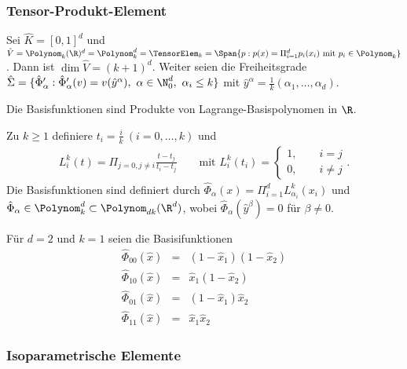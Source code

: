 \subsubsection{Tensor-Produkt-Element}



Sei $\hat K = [0, 1]^d$ und $\hat V = \Polynom_k(\R)^d = \Polynom_k^d = \TensorElem_k =
\Span\{p: p(x) = \Pi_{i=1}^d p_i(x_i) \text{ mit } p_i\in \Polynom_k\}$.
Dann ist $\dim \hat V = (k + 1)^d$.
Weiter seien die Freiheitsgrade $\hat \Sigma = \{\hat{\Phi}_\alpha^\prime:
 \hat{\Phi}_\alpha^\prime(v) = v(\hat{y}^\alpha), \ \alpha\in \N_0^d, \ \alpha_i
\le k\}$ mit $\hat{y}^\alpha = \frac{1}{k} (\alpha_1, \dots, \alpha_d)$.

Die Basisfunktionen sind Produkte von Lagrange-Basispolynomen in $\R$.

Zu $k \ge 1$ definiere $t_i = \frac{i}{k} \ (i = 0, \dots, k)$ und
\begin{eqnarray*}
    L_i^k(t) = \Pi_{j=0,j\neq i} \frac{t - t_j}{t_i - t_j}
    \qquad \text{mit }
    L_i^k(t_i) = \begin{cases}
                      1, \qquad i = j \\
                      0, \qquad i\neq j
                 \end{cases}.
\end{eqnarray*}
Die Basisfunktionen sind definiert durch
$\hat{\Phi}_\alpha(x) = \Pi_{i=1}^d L_{\alpha_i}^k(x_i)$
und $\hat{\Phi}_\alpha\in \Polynom_k^d \subset \Polynom_{dk}(\R^d)$,
wobei
$\hat{\Phi}_\alpha(\hat{y}^\beta) = 0$ für $\beta \neq 0$.


\begin{Beispiel}
    Für $d = 2$ und $k = 1$ seien die Basisifunktionen
    \begin{eqnarray*}
            \hat \Phi_{00}(\hat x)
        &=& (1 - \hat x_1) (1 - \hat x_2) \\
            \hat\Phi_{10}(\hat x)
        &=& \hat x_1 (1 - \hat x_2) \\
            \hat \Phi_{01}(\hat x)
        &=& (1 - \hat x_1) \hat x_2 \\
            \hat \Phi_{11}(\hat x)
        &=& \hat x_1 \hat x_2
    \end{eqnarray*}
\end{Beispiel}


\subsubsection{Isoparametrische Elemente}



